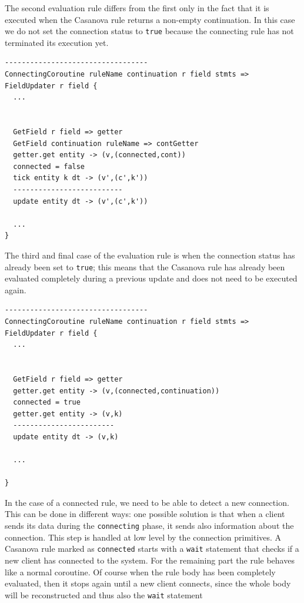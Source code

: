 \noindent
The second evaluation rule differs from the first only in the fact that it is executed when the Casanova rule returns a non-empty continuation. In this case we do not set the connection status to \texttt{true} because the connecting rule has not terminated its execution yet.

\begin{lstlisting}
----------------------------------
ConnectingCoroutine ruleName continuation r field stmts => FieldUpdater r field {
  ...
  
  
  GetField r field => getter
  GetField continuation ruleName => contGetter
  getter.get entity -> (v,(connected,cont))
  connected = false
  tick entity k dt -> (v',(c',k'))
  --------------------------
  update entity dt -> (v',(c',k'))
  
  ...
}
\end{lstlisting}

\noindent
The third and final case of the evaluation rule is when the connection status has already been set to \texttt{true}; this means that the Casanova rule has already been evaluated completely during a previous update and does not need to be executed again.\\

\begin{lstlisting}
----------------------------------
ConnectingCoroutine ruleName continuation r field stmts => FieldUpdater r field {
  ...
  

  GetField r field => getter
  getter.get entity -> (v,(connected,continuation))
  connected = true
  getter.get entity -> (v,k)
  ------------------------
  update entity dt -> (v,k)
  
  ...

} 
\end{lstlisting}

\noindent
In the case of a connected rule, we need to be able to detect a new connection. This can be done in different ways: one possible solution is that when a client sends its data during the \texttt{connecting} phase, it sends also information about the connection. This step is handled at low level by the connection primitives. A Casanova rule marked as \texttt{connected} starts with a \texttt{wait} statement that checks if a new client has connected to the system. For the remaining part the rule behaves like a normal coroutine. Of course when the rule body has been completely evaluated, then it stops again until a new client connects, since the whole body will be reconstructed and thus also the \texttt{wait} statement


